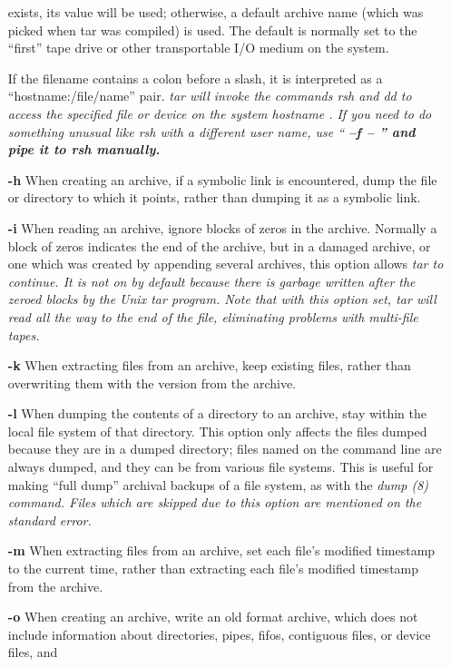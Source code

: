 \begin{itemize}
exists, its value will be used; otherwise,
a default archive name (which was picked when tar was compiled) is used.
The default is normally set to the ``first'' tape drive or other transportable
I/O medium on the system.
\item[{}]
If the filename contains a colon before a slash, it is interpreted
as a ``hostname:/file/name'' pair.  %
\it tar \rm%
 will invoke the commands
%
\it rsh \rm%
 and %
\it dd \rm%
 to access the specified file or device on the
system %
\it hostname\rm%
.  If you need to do something unusual like rsh with
a different user name, use ``%
\bf --f --\rm%
'' and pipe it to rsh manually.
\item[{\bf -h\rm}]
When creating an archive, if a symbolic link is encountered, dump
the file or directory to which it points, rather than
dumping it as a symbolic link.
\item[{\bf -i\rm}]
When reading an archive, ignore blocks of zeros in the archive.  Normally
a block of zeros indicates the end of the archive,
but in a damaged archive, or one which was
created by appending several archives, this option allows %
\it tar \rm%
 to 
continue.  It is not on by default because there is garbage written after the
zeroed blocks by the Unix %
\it tar \rm%
 program.  Note that with this option
set, %
\it tar \rm%
 will read all the way to the end of the file, eliminating
problems with multi-file tapes.
\item[{\bf -k\rm}]
When extracting files from an archive, keep existing files, rather than
overwriting them with the version from the archive.
\item[{\bf -l\rm}]
When dumping the contents of a directory to an archive, stay within the
local file system of that directory.  This option
only affects the files dumped because
they are in a dumped directory; files named on the command line are
always dumped, and they can be from various file systems.
This is useful for making ``full dump'' archival backups of a file system,
as with the %
\it dump\rm%
(8) command.  Files which are skipped due to this
option are mentioned on the standard error.
\item[{\bf -m\rm}]
When extracting files from an archive, set each file's modified timestamp
to the current time, rather than extracting each file's modified
timestamp from the archive.
\item[{\bf -o\rm}]
When creating an archive, write an old format archive, which does not
include information about directories, pipes, fifos, 
contiguous files, or device files, and 

\end{itemize}
